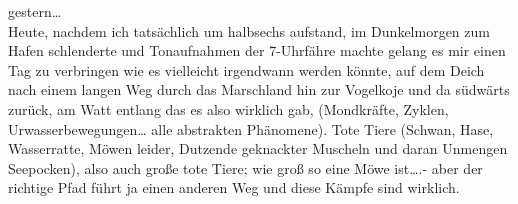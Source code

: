\documentclass[
]{article}
\begin{document}
gestern\ldots{}\\
Heute, nachdem ich tatsächlich um halbsechs aufstand, im Dunkelmorgen
zum Hafen schlenderte und Tonaufnahmen der 7-Uhrfähre machte gelang es
mir einen Tag zu verbringen wie es vielleicht irgendwann werden könnte,
auf dem Deich nach einem langen Weg durch das Marschland hin zur
Vogelkoje und da südwärts zurück, am Watt entlang das es also wirklich
gab, (Mondkräfte, Zyklen, Urwasserbewegungen\ldots{} alle abstrakten
Phänomene). Tote Tiere (Schwan, Hase, Wasserratte, Möwen leider,
Dutzende geknackter Muscheln und daran Unmengen Seepocken), also auch
große tote Tiere; wie groß so eine Möwe ist\ldots.- aber der richtige
Pfad führt ja einen anderen Weg und diese Kämpfe sind wirklich.
\end{document}
